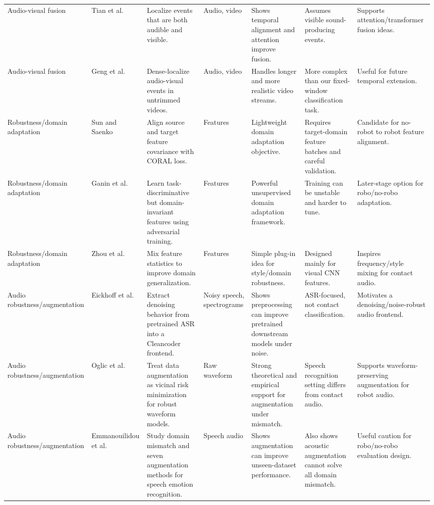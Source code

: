 \documentclass[12pt,a4paper]{article}
\begin{document}
\begin{landscape}
\begin{longtable}{P{2.3cm}P{3.6cm}P{4.0cm}P{2.5cm}P{3.4cm}P{3.4cm}P{4.2cm}}
Audio-visual fusion & Tian et al.~\cite{tian2018ave} & Localize events that are both audible and visible. & Audio, video & Shows temporal alignment and attention improve fusion. & Assumes visible sound-producing events. & Supports attention/transformer fusion ideas. \\
Audio-visual fusion & Geng et al.~\cite{geng2023unav} & Dense-localize audio-visual events in untrimmed videos. & Audio, video & Handles longer and more realistic video streams. & More complex than our fixed-window classification task. & Useful for future temporal extension. \\
Robustness/domain adaptation & Sun and Saenko~\cite{sun2016deepcoral} & Align source and target feature covariance with CORAL loss. & Features & Lightweight domain adaptation objective. & Requires target-domain feature batches and careful validation. & Candidate for no-robot to robot feature alignment. \\
Robustness/domain adaptation & Ganin et al.~\cite{ganin2016dann} & Learn task-discriminative but domain-invariant features using adversarial training. & Features & Powerful unsupervised domain adaptation framework. & Training can be unstable and harder to tune. & Later-stage option for robo/no-robo adaptation. \\
Robustness/domain adaptation & Zhou et al.~\cite{zhou2021mixstyle} & Mix feature statistics to improve domain generalization. & Features & Simple plug-in idea for style/domain robustness. & Designed mainly for visual CNN features. & Inspires frequency/style mixing for contact audio. \\
Audio robustness/augmentation & Eickhoff et al.~\cite{eickhoff2023bring} & Extract denoising behavior from pretrained ASR into a Cleancoder frontend. & Noisy speech, spectrograms & Shows preprocessing can improve pretrained downstream models under noise. & ASR-focused, not contact classification. & Motivates a denoising/noise-robust audio frontend. \\
Audio robustness/augmentation & Oglic et al.~\cite{oglic2022waveform} & Treat data augmentation as vicinal risk minimization for robust waveform models. & Raw waveform & Strong theoretical and empirical support for augmentation under mismatch. & Speech recognition setting differs from contact audio. & Supports waveform-preserving augmentation for robot audio. \\
Audio robustness/augmentation & Emmanouilidou et al.~\cite{emmanouilidou2024domain} & Study domain mismatch and seven augmentation methods for speech emotion recognition. & Speech audio & Shows augmentation can improve unseen-dataset performance. & Also shows acoustic augmentation cannot solve all domain mismatch. & Useful caution for robo/no-robo evaluation design. \\
\end{longtable}
\end{landscape}
\end{document}
